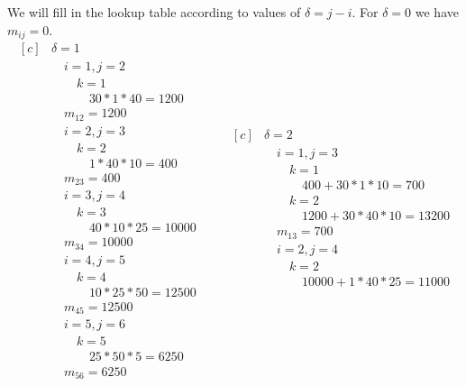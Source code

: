 \documentclass[a4paper]{article}
\begin{document}
\begin{enumerate}
    We will fill in the lookup table according to values of $\delta = j-i$. For $\delta=0$ we have $m_{ij} = 0$.
    \begin{equation*}
      \begin{aligned}[c]
      &\delta = 1 \\
      &\quad i=1, j=2 \\
      &\quad \quad k=1 \\
      &\quad \quad \quad 30*1*40 = 1200 \\
      &\quad m_{12} = 1200\\
      &\quad i=2, j=3 \\
      &\quad \quad k=2 \\
      &\quad \quad \quad 1 * 40 * 10 = 400 \\
      &\quad m_{23} = 400 \\
      &\quad i=3, j=4 \\
      &\quad \quad k=3 \\
      &\quad \quad \quad 40 * 10 * 25 = 10000 \\
      &\quad m_{34} = 10000 \\
      &\quad i=4, j=5 \\
      &\quad \quad k=4 \\
      &\quad \quad \quad 10 * 25 * 50 = 12500 \\
      &\quad m_{45} = 12500 \\
      &\quad i=5, j=6 \\
      &\quad \quad k=5 \\
      &\quad \quad \quad 25*50*5=6250 \\
      &\quad m_{56} = 6250
    \end{aligned}
    \quad \quad
    \begin{aligned}[c]
      &\delta=2 \\
      &\quad i=1, j=3 \\
      &\quad \quad k=1 \\
      &\quad \quad \quad 400 + 30*1*10 = 700 \\
      &\quad \quad k=2 \\
      &\quad \quad \quad 1200 + 30*40*10 = 13200 \\
      &\quad m_{13} = 700 \\
      &\quad i=2, j=4 \\
      &\quad \quad k=2 \\
      &\quad \quad \quad 10000+1*40*25=11000 \\

\end{aligned}
\end{equation*}
\end{enumerate}
\end{document}
